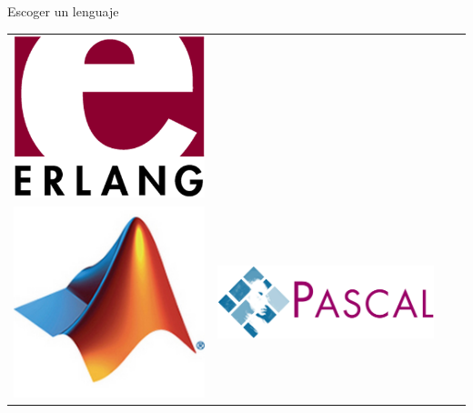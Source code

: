 \begin{frame}{Escoger un lenguaje}
\begin{center}
\begin{tabular}{c c c c}
      \includegraphics[scale=0.1]{img/erlang} \\

      \includegraphics[scale=0.05]{img/matlab} &
      \includegraphics[scale=0.05]{img/pascal} &

\end{tabular}
\end{center}
\end{frame}
